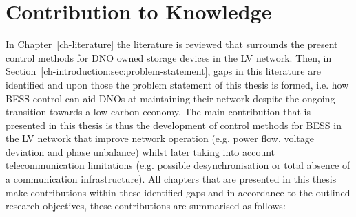 \section{Contribution to Knowledge}
\label{ch-conclusions:sec:knowledge-contribution}

In Chapter~\ref{ch-literature} the literature is reviewed that surrounds the present control methods for DNO owned storage devices in the LV network.
Then, in Section~\ref{ch-introduction:sec:problem-statement}, gaps in this literature are identified and upon those the problem statement of this thesis is formed, i.e. how BESS control can aid DNOs at maintaining their network despite the ongoing transition towards a low-carbon economy.
The main contribution that is presented in this thesis is thus the development of control methods for BESS in the LV network that improve network operation (e.g. power flow, voltage deviation and phase unbalance) whilst later taking into account telecommunication limitations (e.g. possible desynchronisation or total absence of a communication infrastructure).
All chapters that are presented in this thesis make contributions within these identified gaps and in accordance to the outlined research objectives, these contributions are summarised as follows:

